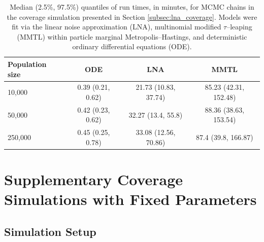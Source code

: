 \newpage
\begin{table}[htbp]
	\small
	\centering
	\begin{tabular}{lccc}
		\hline
		\textbf{Population siz}e & \textbf{ODE} & \textbf{LNA} & \textbf{MMTL}\\ 
		\hline
		10,000 & 0.39 (0.21, 0.62) & 21.73 (10.83, 37.74) & 85.23 (42.31, 152.48) \\ 
		50,000& 0.42 (0.23, 0.62) & 32.27 (13.4, 55.8) & 88.36 (38.63, 153.54) \\ 
		250,000 & 0.45 (0.25, 0.78) & 33.08 (12.56, 70.86) & 87.4 (39.8, 166.87) \\
		\hline
	\end{tabular}
	\caption[Run times for coverage simulation SIR models fit via the LNA, ODE, and MMTL approximations.]{Median (2.5\%, 97.5\%) quantiles of run times, in minutes, for MCMC chains in the coverage simulation presented in Section \ref{subsec:lna_coverage}. Models were fit via the linear noise approximation (LNA), multinomial modified $ \tau $--leaping (MMTL) within particle marginal Metropolis--Hastings, and deterministic ordinary differential equations (ODE).}
\end{table}	

\newpage

\section{Supplementary Coverage Simulations with Fixed Parameters}
\label{sec:lna_fixedpar_coverage}

\subsection{Simulation Setup}
\label{subsec:lna_fixedpar_setup}

